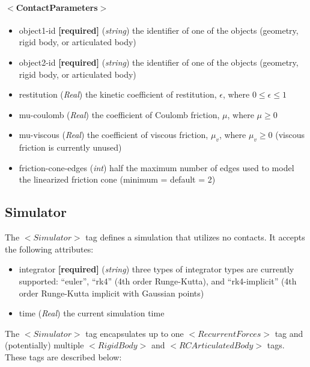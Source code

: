 \documentclass{article}
\begin{document}
\begin{landscape}
\begin{itemize}
\paragraph{$<$ContactParameters$>$}
\begin{itemize}
\item object1-id  \textbf{[required]} (\emph{string}) the identifier of one of the objects (geometry, rigid body, or articulated body)
\item object2-id  \textbf{[required]} (\emph{string}) the identifier of one of the objects (geometry, rigid body, or articulated body)
\item restitution  (\emph{Real}) the kinetic coefficient of restitution, $\epsilon$, where $0 \leq \epsilon \leq 1$
\item mu-coulomb  (\emph{Real}) the coefficient of Coulomb friction, $\mu$, where $\mu \geq 0$
\item mu-viscous  (\emph{Real}) the coefficient of viscous friction, $\mu_v$, where $\mu_v \geq 0$ (viscous friction is currently unused)
\item friction-cone-edges  (\emph{int}) half the maximum number of edges used to model the linearized friction cone (minimum = default = 2)
\end{itemize}
\end{itemize}

\subsection{Simulator}
\label{section:simulator}
The $<Simulator>$ tag defines a simulation that utilizes no contacts.  It accepts the following attributes:
\begin{itemize}
\item integrator \textbf{[required]} (\emph{string}) three types of integrator types are currently supported: ``euler'', ``rk4'' (4th order Runge-Kutta), and ``rk4-implicit'' (4th order Runge-Kutta implicit with Gaussian points)
\item time (\emph{Real})  the current simulation time
\end{itemize}

The $<Simulator>$ tag encapsulates up to one $<RecurrentForces>$ tag and (potentially) multiple $<RigidBody>$ and $<RCArticulatedBody>$ tags.  These tags are described below:

\end{landscape}
\end{document}
